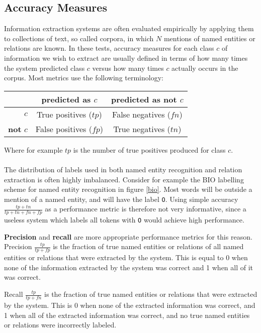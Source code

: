 \subsection{Accuracy Measures}
Information extraction systems are often evaluated empirically by applying them to collections of text, so called corpora, in which $N$ mentions of named entities or relations are known. In these tests, accuracy measures for each class $c$ of information we wish to extract are usually defined in terms of how many times the system predicted class $c$ versus how many times $c$ actually occurs in the corpus. Most metrics use the following terminology:

\begin{center}
	\begin{tabular}{r | c c}
	 & \textbf{predicted as $c$} & \textbf{predicted as not $c$}  \\ \hline
	$c$ & True positives ($tp$) & False negatives ($fn$) \\
	\textbf{not} $c$ & False positives ($fp$) & True negatives ($tn$)
\end{tabular}
\end{center}
Where for example $tp$ is the number of true positives produced for class $c$.
\\\\
The distribution of labels used in both named entity recognition and relation extraction is often highly imbalanced. Consider for example the BIO labelling scheme for named entity recognition in figure \ref{bio}. Most words will be outside a mention of a named entity, and will have the label \texttt{O}. Using simple accuracy $\frac{tp + tn}{tp + tn + fn + fp}$ as a performance metric is therefore not very informative, since a useless system which labels all tokens with \texttt{O} would achieve high performance.

\textbf{Precision} and \textbf{recall} are more appropriate performance metrics for this reason. Precision $\frac{tp}{tp + fp}$ is the fraction of true named entities or relations of all named entities or relations that were extracted by the system. This is equal to 0 when none of the information extracted by the system was correct and 1 when all of it was correct. 

Recall $\frac{tp}{tp + fn}$ is the fraction of true named entities or relations that were extracted by the system. This is 0 when none of the extracted information was correct, and 1 when all of the extracted information was correct, and no true named entities or relations were incorrectly labeled.


